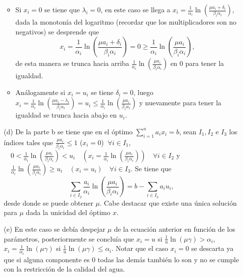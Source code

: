 \begin{enumerate}
\begin{itemize}
    \item Si $x_i = 0$ se tiene que $\lambda_i = 0$, en este caso se llega a $x_i = \frac{1}{\alpha_i} \ln \left( \frac{\mu a_i + \delta_i}{\beta_i \alpha_i} \right)$, dada la monotonía del logaritmo (recordar que los multiplicadores son no negativos) se desprende que 
    \[
    x_i = \frac{1}{\alpha_i} \ln \left( \frac{\mu a_i + \delta_i}{\beta_i \alpha_i} \right) = 0 \geq \frac{1}{\alpha_i} \ln \left( \frac{\mu a_i}{\beta_i \alpha_i} \right),
    \]
    de esta manera se trunca hacia arriba $\frac{1}{\alpha_i} \ln \left( \frac{\mu a_i}{\beta_i \alpha_i} \right)$ en 0 para tener la igualdad.

    \item Análogamente si $x_i = u_i$ se tiene $\delta_i = 0$, luego $x_i = \frac{1}{\alpha_i} \ln \left( \frac{\mu a_i - \lambda_i}{\beta_i \alpha_i} \right) = u_i \leq \frac{1}{\alpha_i} \ln \left( \frac{\mu a_i}{\beta_i \alpha_i} \right)$ y nuevamente para tener la igualdad se trunca hacia abajo en $u_i$.
\end{itemize}
  \item[(d)] De la parte b se tiene que en el óptimo $\sum_{i=1}^{n} a_i x_i = b$, sean $I_1, I_2$ e $I_3$ los índices tales que $\frac{\mu a_i}{\beta_i \alpha_i} \leq 1$ ($x_i = 0$) $\ \forall i \in I_1$, $\quad 0 < \frac{1}{\alpha_i} \ln \left( \frac{\mu a_i}{\beta_i \alpha_i} \right) < u_i \quad (x_i = \frac{1}{\alpha_i} \ln \left( \frac{\mu a_i}{\beta_i \alpha_i} \right)) \quad \forall i \in I_2$ y $\quad \frac{1}{\alpha_i} \ln \left( \frac{\mu a_i}{\beta_i \alpha_i} \right) \geq u_i \quad (x_i = u_i) \quad \forall i \in I_3$. Se tiene que 
\[
\sum_{i \in I_2} \frac{a_i}{\alpha_i} \ln \left( \frac{\mu a_i}{\beta_i \alpha_i} \right) = b - \sum_{i \in I_3} a_i u_i,
\]
desde donde se puede obtener $\mu$. Cabe destacar que existe una única solución para $\mu$ dada la unicidad del óptimo $x$.
  \item[(e)] En este caso se debía despejar $\mu$ de la ecuación anterior en función de los parámetros, posteriormente se concluía que $x_i = u$ si $\frac{1}{u} \ln(\mu \gamma) > \alpha_i$, $x_i = \frac{1}{\alpha_i} \ln(\mu \gamma)$ si $\frac{1}{u} \ln(\mu \gamma) \leq \alpha_i$. Notar que el caso $x_i = 0$ se descarta ya que si alguna componente es 0 todas las demás también lo son y no se cumple con la restricción de la calidad del agua.
\end{enumerate}
